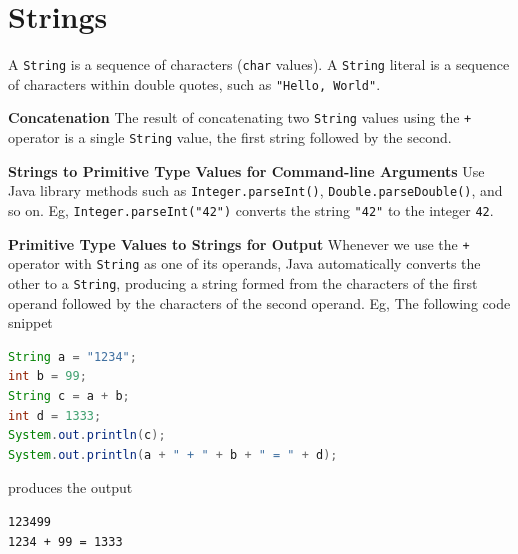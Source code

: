 \documentclass[8pt,a4paper,compress]{beamer}
\begin{document}
\section{Strings}
\begin{frame}[fragile]
\pause

A \lstinline$String$ is a sequence of characters (\lstinline$char$ values). A \lstinline$String$ literal is a sequence of characters within double quotes, such as \lstinline$"Hello, World"$. 

\pause
\smallskip

\textbf{Concatenation} The result of concatenating two \lstinline$String$ values using the \lstinline$+$ operator is a single \lstinline$String$ value, the first string followed by the second.

\pause
\smallskip

\textbf{Strings to Primitive Type Values for Command-line Arguments} Use Java library methods such as \lstinline$Integer.parseInt()$, \lstinline$Double.parseDouble()$, and so on. Eg, \lstinline$Integer.parseInt("42")$ converts the string \lstinline$"42"$ to the integer \lstinline$42$.

\pause
\smallskip


\textbf{Primitive Type Values to Strings for Output} Whenever we use the \lstinline$+$ operator with \lstinline$String$ as one of its operands, Java automatically converts the other to a \lstinline$String$, producing a string formed from the characters of the first operand followed by the characters of the second operand. Eg, The following code snippet 

\begin{lstlisting}[language=Java]
String a = "1234";
int b = 99;
String c = a + b;
int d = 1333;
System.out.println(c);
System.out.println(a + " + " + b + " = " + d);
\end{lstlisting}

produces the output
\begin{lstlisting}[language=bash]
123499
1234 + 99 = 1333 
\end{lstlisting}

\end{frame}
\end{document}

